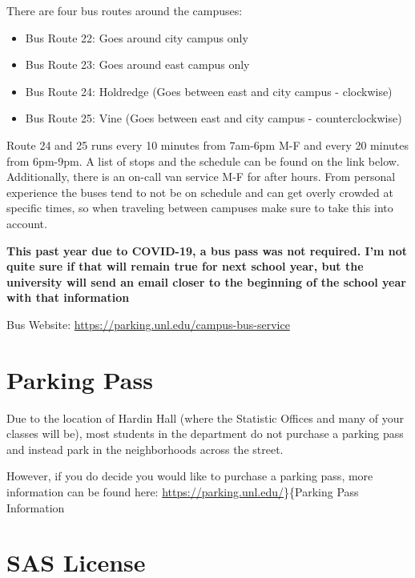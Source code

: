 \documentclass[
  12pt,
]{book}
\providecommand{\tightlist}{%
  \setlength{\itemsep}{0pt}\setlength{\parskip}{0pt}}
\begin{document}
There are four bus routes around the campuses:

\begin{itemize}
\tightlist
\item
  Bus Route 22: Goes around city campus only
\item
  Bus Route 23: Goes around east campus only
\item
  Bus Route 24: Holdredge (Goes between east and city campus - clockwise)
\item
  Bus Route 25: Vine (Goes between east and city campus - counterclockwise)
\end{itemize}

Route 24 and 25 runs every 10 minutes from 7am-6pm M-F and every 20 minutes from 6pm-9pm. A list of stops and the schedule can be found on the link below. Additionally, there is an on-call van service M-F for after hours. From personal experience the buses tend to not be on schedule and can get overly crowded at specific times, so when traveling between campuses make sure to take this into account.

\textbf{This past year due to COVID-19, a bus pass was not required. I'm not quite sure if that will remain true for next school year, but the university will send an email closer to the beginning of the school year with that information}

Bus Website: \url{https://parking.unl.edu/campus-bus-service}

\hypertarget{parking-pass}{%
\section{Parking Pass}\label{parking-pass}}

Due to the location of Hardin Hall (where the Statistic Offices and many of your classes will be), most students in the department do not purchase a parking pass and instead park in the neighborhoods across the street.

However, if you do decide you would like to purchase a parking pass, more information can be found here: \url{https://parking.unl.edu/}\}\{Parking Pass Information

\hypertarget{sas-license}{%
\section{SAS License}\label{sas-license}}
\end{document}
